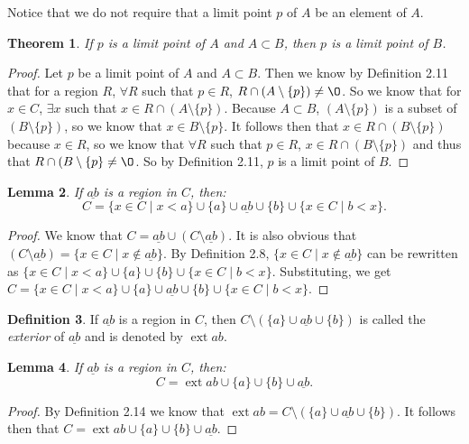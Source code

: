 \documentclass[12pt]{article}
\renewcommand{\emptyset}{\O}
\renewcommand{\_}[1]{\underline{ #1 }}
\DeclareMathOperator{\ext}{ext}
\newtheorem{theorem}{Theorem}[section]
\newtheorem{lemma}[theorem]{Lemma}
\theoremstyle{definition}
\newtheorem{definition}[theorem]{Definition}
\numberwithin{equation}{subsection}
\begin{document}
Notice that we do not require that a limit point $p$ of $A$ be an element of $A$.

\begin{theorem} If $p$ is a limit point of $A$ and $A \subset B$, then $p$ is a limit point of $B$.
\end{theorem}

\begin{proof}
Let $p$ be a limit point of $A$ and $A \subset B$. Then we know by Definition 2.11 that for a region $R$, $\forall R$ such that $p \in R$, $R \cap (A \setminus \{p\}) \not = \emptyset$. So we know that for $x \in C$, $\exists x$ such that $x \in R \cap (A \setminus \{p\})$. Because $A \subset B$, $(A \setminus \{p\})$ is a subset of $(B \setminus \{p\})$, so we know that $x \in B \setminus \{p\}$. It follows then that $x \in R \cap (B \setminus \{p\})$ because $x \in R$, so we know that $\forall R$ such that $p \in R$, $x \in R \cap (B \setminus \{p\})$ and thus that $R \cap (B \setminus \{p\} \not = \emptyset$. So by Definition 2.11, $p$ is a limit point of $B$.
\end{proof}

\begin{lemma} If $\_{ab}$ is a region in $C$, then:
\[
C = \{ x\in C \mid x < a \} \cup \{a\} \cup \_{ab} \cup \{b \} \cup \{ x\in C \mid b < x \}.
\]
\end{lemma}

\begin{proof}
We know that $C = \_{ab} \cup (C \setminus \_{ab})$. It is also obvious that $(C \setminus \_{ab}) = \{x \in C \mid x \not \in \_{ab}\}$. By Definition 2.8, $\{x \in C \mid x \not \in \_{ab}\}$ can be rewritten as $\{x \in C \mid x < a\} \cup \{a\} \cup \{b\} \cup \{x \in C \mid b < x\}$. Substituting, we get $C = \{ x\in C \mid x < a \} \cup \{a\} \cup \_{ab} \cup \{b \} \cup \{ x\in C \mid b < x \}$.
\end{proof}

\begin{definition} If $\_{ab}$ is a region in $C$, then $C \setminus (\{a\} \cup \_{ab} \cup \{b\})$ is called the \emph{exterior} of $\_{ab}$ and is denoted by $\ext{ab}$.
\end{definition}

\begin{lemma}  If $\_{ab}$ is a region in $C$, then:
\[
C = \ext{ab} \cup \{a\} \cup \{b\} \cup \_{ab}. 
\]
\end{lemma}

\begin{proof}
By Definition 2.14 we know that $\ext{ab} = C \setminus (\{a\} \cup \_{ab} \cup \{b\})$. It follows then that $C = \ext{ab} \cup \{a\} \cup \{b\} \cup \_{ab}$. 
\end{proof}
\end{document}
